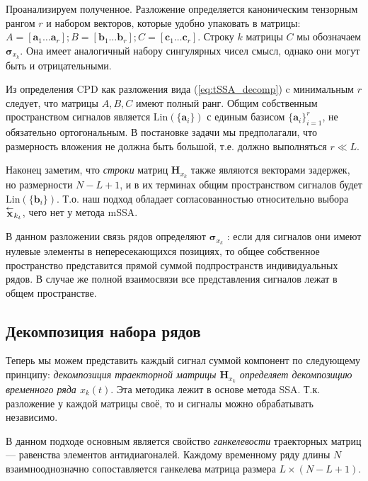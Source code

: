 	    	Проанализируем полученное. Разложение определяется каноническим тензорным рангом $ r $ и набором векторов, которые удобно упаковать в матрицы: $ A = [\mathbf{a}_1 \ldots \mathbf{a}_r]; B = [\mathbf{b}_1 \ldots \mathbf{b}_r]; C = [\mathbf{c}_1 \ldots \mathbf{c}_r] $. Строку $ k $ матрицы $ C $ мы обозначаем $ \boldsymbol{\sigma}_{x_k} $. Она имеет аналогичный набору сингулярных чисел смысл, однако они могут быть и отрицательными.
	    	
	    	Из определения CPD как разложения вида (\ref{eq:tSSA_decomp}) c минимальным $ r $ следует, что матрицы $ A, B, C $ имеют полный ранг. Общим собственным пространством сигналов является $ \text{Lin}(\{\mathbf{a}_i\}) $ с единым базисом $ \{\mathbf{a}_i\}_{i = 1}^r $, не обязательно ортогональным. В постановке задачи мы предполагали, что размерность вложения не должна быть большой, т.е. должно выполняться $ r \ll L $.
	    	
	    	Наконец заметим, что \emph{строки} матриц $ \mathbf{H}_{x_k} $ также являются векторами задержек, но размерности $ N - L + 1 $, и в их терминах общим пространством сигналов будет $ \text{Lin}(\{\mathbf{b}_i\}) $. Т.о. наш подход обладает согласованностью относительно выбора $ \overset{\leftarrow}{\mathbf{x}}_{k_t} $, чего нет у метода mSSA.
	    	
	    	В данном разложении связь рядов определяют $ \boldsymbol{\sigma}_{x_k} $ : если для сигналов они имеют нулевые элементы в непересекающихся позициях, то общее собственное пространство представится прямой суммой подпространств индивидуальных рядов. В случае же полной взаимосвязи все представления сигналов лежат в общем пространстве.
	    	
	    \subsection{Декомпозиция набора рядов}\label{sec:decomposition}
	    
	    	Теперь мы можем представить каждый сигнал суммой компонент по следующему принципу: \emph{декомпозиция траекторной матрицы $ \mathbf{H}_{x_k} $ определяет декомпозицию временного ряда $ x_k(t) $}. Эта методика лежит в основе метода SSA. Т.к. разложение у каждой матрицы своё, то и сигналы можно обрабатывать независимо.
	    	
	    	В данном подходе основным является свойство \emph{ганкелевости} траекторных матриц --- равенства элементов антидиагоналей. Каждому временному ряду длины $ N $ взаимнооднозначно сопоставляется ганкелева матрица размера $ L \times (N - L + 1) $.
	    	
